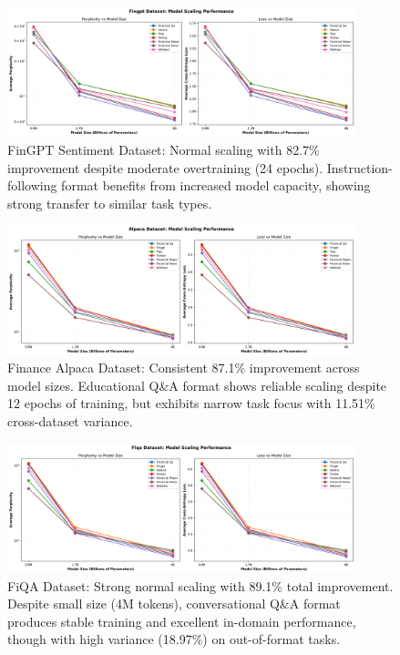 \begin{figure}[htbp]
\centering
\includegraphics[width=0.9\textwidth]{figures/scaling_fingpt.png}
\caption[FinGPT Sentiment Dataset: Scaling Behavior]{FinGPT Sentiment Dataset: Normal scaling with 82.7\% improvement despite moderate overtraining (24 epochs). Instruction-following format benefits from increased model capacity, showing strong transfer to similar task types.}
\label{fig:scaling_fingpt}
\end{figure}

\begin{figure}[htbp]
\centering
\includegraphics[width=0.9\textwidth]{figures/scaling_alpaca.png}
\caption[Finance Alpaca Dataset: Scaling Behavior]{Finance Alpaca Dataset: Consistent 87.1\% improvement across model sizes. Educational Q\&A format shows reliable scaling despite 12 epochs of training, but exhibits narrow task focus with 11.51\% cross-dataset variance.}
\label{fig:scaling_alpaca}
\end{figure}

\begin{figure}[htbp]
\centering
\includegraphics[width=0.9\textwidth]{figures/scaling_fiqa.png}
\caption[FiQA Dataset: Scaling Behavior]{FiQA Dataset: Strong normal scaling with 89.1\% total improvement. Despite small size (4M tokens), conversational Q\&A format produces stable training and excellent in-domain performance, though with high variance (18.97\%) on out-of-format tasks.}
\label{fig:scaling_fiqa}
\end{figure}

